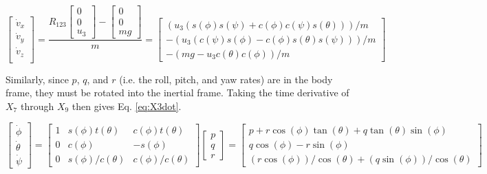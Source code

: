 \documentclass[letterpaper, preprint, paper,11pt]{AAS}	%
\begin{document}
\begin{equation}
\label{eq:X2dot}
\begin{bmatrix}
\dot{v}_x\\
\dot{v}_y\\
\dot{v}_z\\
\end{bmatrix}
= \frac{R_{123}
\begin{bmatrix}
0\\
0\\
u_3
\end{bmatrix}
-
\begin{bmatrix}
0\\
0\\
mg
\end{bmatrix}}{m}=
\begin{bmatrix}
(u_3(s(\phi)s(\psi) + c(\phi)c(\psi)s(\theta)))/m \\
-(u_3(c(\psi)s(\phi) - c(\phi)s(\theta)s(\psi)))/m \\
-(mg - u_3c(\theta)c(\phi))/m
\end{bmatrix}
\end{equation}

Similarly, since $p$, $q$, and $r$ (i.e. the roll, pitch, and yaw rates) are in the body frame, they must be rotated into the inertial frame. Taking the time derivative of $X_7$ through $X_9$ then gives Eq. \eqref{eq:X3dot}.

\begin{equation}
\label{eq:X3dot}
\begin{bmatrix}
\dot{\phi}\\
\dot{\theta}\\
\dot{\psi}
\end{bmatrix}=
\begin{bmatrix}
1& s(\phi)t(\theta)&  c(\phi)t(\theta)\\
0& c(\phi)&          -s(\phi)\\
0& s(\phi)/c(\theta)&c(\phi)/c(\theta)
\end{bmatrix}
\begin{bmatrix}
p\\
q\\
r
\end{bmatrix}=
\begin{bmatrix}
p + r\cos(\phi)\tan(\theta) + q\tan(\theta)\sin(\phi) \\
q\cos(\phi) - r\sin(\phi) \\
(r\cos(\phi))/\cos(\theta) + (q\sin(\phi))/\cos(\theta)
\end{bmatrix}
\end{equation}
\end{document}
